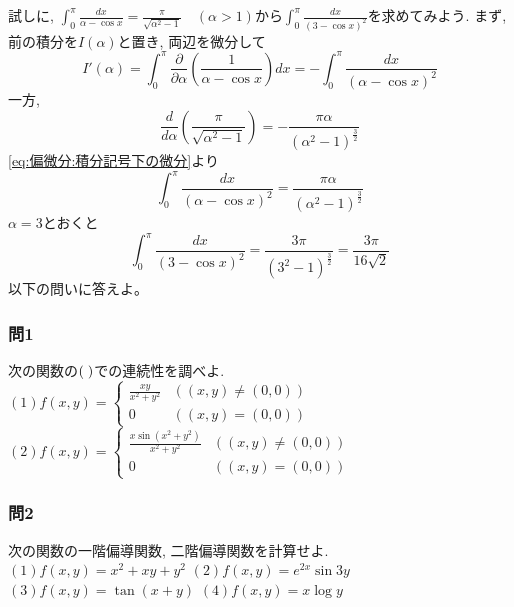         試しに, $\displaystyle\int_{0}^{\pi}\frac{dx}{\alpha-\cos x}=\frac{\pi}{\sqrt{\alpha^2-1}}\quad(\alpha>1)$から$\displaystyle\int_{0}^{\pi}\frac{dx}{(3-\cos x)^2}$を求めてみよう.
        まず, 前の積分を$I(\alpha)$と置き, 両辺を微分して
        \begin{equation*}
            I'(\alpha) = \int_{0}^{\pi}\frac{\partial}{\partial\alpha}\left(\frac{1}{\alpha-\cos x}\right)dx = -\int_0^\pi\frac{dx}{(\alpha-\cos x)^2}
        \end{equation*}
        一方,
        \begin{equation*}
            \frac{d}{d\alpha}\left(\frac{\pi}{\sqrt{\alpha^2-1}}\right)=-\frac{\pi\alpha}{(\alpha^2-1)^{\frac{3}{2}}}
        \end{equation*}
        \eqref{eq:偏微分:積分記号下の微分}より
        \begin{equation*}
            \int_0^\pi\frac{dx}{(\alpha-\cos x)^2}=\frac{\pi\alpha}{(\alpha^2-1)^{\frac{3}{2}}}
        \end{equation*}
        $\alpha=3$とおくと
        \begin{equation*}
            \int_0^\pi\frac{dx}{(3-\cos x)^2}=\frac{3\pi}{(3^2-1)^{\frac{3}{2}}}=\frac{3\pi}{16\sqrt{2}} 
        \end{equation*}
    \clearpage
    \basicquestion 以下の問いに答えよ。

    \subsubsection*{問1} 次の関数の$(\hspace{1mm})$での連続性を調べよ.\\
        $(1)f(x,y)=\left\{\begin{array}{cc}\displaystyle\frac{xy}{x^2+y^2} & ((x,y)\neq(0,0))\\ 0 & ((x,y)=(0,0))\end{array}\right.$\hspace{1mm}
        $(2)f(x,y)=\left\{\begin{array}{cc}\displaystyle\frac{x\sin(x^2+y^2)}{x^2+y^2} & ((x,y)\neq(0,0))\\ 0 & ((x,y)=(0,0))\end{array}\right.$\hspace{1mm}

    \subsubsection*{問2} 次の関数の一階偏導関数, 二階偏導関数を計算せよ.\\
        $(1)f(x,y)=x^2+xy+y^2$\hspace{1mm}
        $(2)f(x,y)=e^{2x}\sin 3y$\hspace{1mm}
        $(3)f(x,y)=\tan(x+y)$\hspace{1mm}
        $(4)f(x,y)=x\log y$

